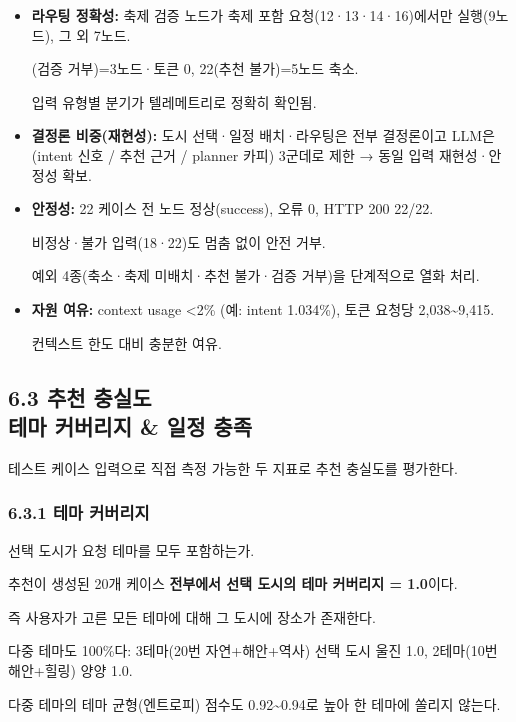 \documentclass[12pt,a4paper]{article}
\newcommand{\DocNeedspace}[1]{\par\ifdim\dimexpr\pagegoal-\pagetotal\relax<#1\newpage\fi}
\providecommand{\tightlist}{\setlength{\itemsep}{0pt}\setlength{\parskip}{0pt}}
\newcommand{\SubsectionBreak}[2]{\texorpdfstring{#1\\[-0.10em]{\normalsize #2}}{#1 #2}}
\begin{document}
\begin{itemize}
\tightlist
\item
  \textbf{라우팅 정확성:} 축제 검증 노드가 축제 포함 요청(12·13·14·16)에서만 실행(9노드), 그 외 7노드.\par{}(검증 거부)=3노드·토큰 0, 22(추천 불가)=5노드 축소.\par\noindent
  입력 유형별 분기가 텔레메트리로 정확히 확인됨.
\item
  \textbf{결정론 비중(재현성):} 도시 선택·일정 배치·라우팅은 전부 결정론이고 LLM은 (intent 신호 / 추천 근거 / planner 카피) 3군데로 제한 → 동일 입력 재현성·안정성 확보.
\item
  \textbf{안정성:} 22 케이스 전 노드 정상(success), 오류 0, HTTP 200 22/22.\par\noindent
  비정상·불가 입력(18·22)도 멈춤 없이 안전 거부.\par\noindent
  예외 4종(축소·축제 미배치·추천 불가·검증 거부)을 단계적으로 열화 처리.
\item
  \textbf{자원 여유:} context usage \textless2\% (예: intent 1.034\%), 토큰 요청당 2,038\textasciitilde9,415.\par\noindent
  컨텍스트 한도 대비 충분한 여유.
\end{itemize}

\DocNeedspace{6\baselineskip}
\subsection*{\SubsectionBreak{6.3 추천 충실도}{테마 커버리지 \& 일정 충족}}

테스트 케이스 입력으로 직접 측정 가능한 두 지표로 추천 충실도를 평가한다.

\DocNeedspace{8\baselineskip}
\subsubsection*{6.3.1 테마 커버리지}

선택 도시가 요청 테마를 모두 포함하는가.

추천이 생성된 20개 케이스 \textbf{전부에서 선택 도시의 테마 커버리지 = 1.0}이다.
\par\noindent 즉 사용자가 고른 모든 테마에 대해 그 도시에 장소가 존재한다.
\par\noindent 다중 테마도 100\%다: 3테마(20번 자연+해안+역사) 선택 도시 울진 1.0, 2테마(10번 해안+힐링) 양양 1.0.
\par\noindent 다중 테마의 테마 균형(엔트로피) 점수도 0.92\textasciitilde0.94로 높아 한 테마에 쏠리지 않는다.
\end{document}
